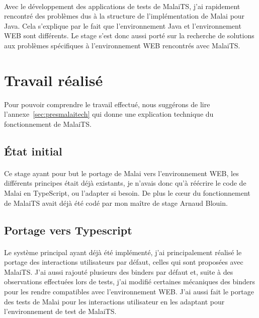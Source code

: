 \documentclass[11pt, a4paper, pdftex]{article}
\begin{document}
            \paragraph{}
                Avec le développement des applications de tests de MalaiTS, j'ai rapidement rencontré des problèmes dus à la structure de l'implémentation de Malai pour Java.
                Cela s'explique par le fait que l'environnement Java et l'environnement WEB sont différents.
                Le stage s'est donc aussi porté sur la recherche de solutions aux problèmes spécifiques à l'environnement WEB rencontrés avec MalaiTS\@.
    \newpage
    \section{Travail réalisé}\label{sec:trarea}
        Pour pouvoir comprendre le travail effectué, nous suggérons de lire l'annexe~\ref{sec:presmalaitech} qui donne une explication technique du fonctionnement de MalaiTS\@.

        \subsection{État initial}\label{subsec:travinit}
            \paragraph{}
                Ce stage ayant pour but le portage de Malai vers l'environnement WEB, les différents principes était déjà existants, je n'avais donc qu'à réécrire le code de Malai en TypeScript, ou l'adapter si besoin.
                De plus le c\oe ur du fonctionnement de MalaiTS avait déjà été codé par mon maître de stage Arnaud Blouin.

        \subsection{Portage vers Typescript}\label{subsec:mainjob}
            \paragraph{}
                Le système principal ayant déjà été implémenté, j'ai principalement réalisé le portage des interactions utilisateurs par défaut, celles qui sont proposées avec MalaiTS\@.
                J'ai aussi rajouté plusieurs des binders par défaut et, suite à des observations effectuées lors de tests, j'ai modifié certaines mécaniques
                des binders pour les rendre compatibles avec l'environnement WEB\@.
                J'ai aussi fait le portage des tests de Malai pour les interactions utilisateur en les adaptant pour l'environnement de test de MalaiTS\@.
\end{document}
